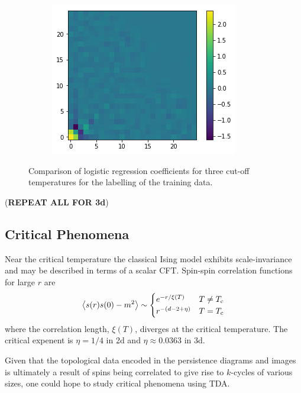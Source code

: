 \documentclass[11pt]{article}
\begin{document}
\begin{figure}[h]
	\begin{subfigure}{0.3\textwidth}
		\centering
		\includegraphics[width=\textwidth]{ising_images/logreg_2d_2519}
	\end{subfigure}
	\caption{Comparison of logistic regression coefficients for three cut-off temperatures for the labelling of the training data.}
	\label{fig:LogRegCoef2dIsing}
\end{figure}

(\textbf{REPEAT ALL FOR 3d})


\subsection{Critical Phenomena}
Near the critical temperature the classical Ising model exhibits scale-invariance and may be described in terms of a scalar CFT. Spin-spin correlation functions for large $r$ are
\begin{equation}
	\ev{s(r)s(0)-m^2} \sim \begin{cases}
		e^{-r/\xi(T)} & T\neq T_\text{c}\\
		r^{-(d-2+\eta)} & T=T_\text{c}
	\end{cases}
\end{equation}
where the correlation length, $\xi(T)$, diverges at the critical temperature. The critical expenent is $\eta=1/4$ in 2d and $\eta\approx0.0363$ in 3d.

Given that the topological data encoded in the persistence diagrams and images is ultimately a result of spins being correlated to give rise to $k$-cycles of various sizes, one could hope to study critical phenomena using TDA.
\end{document}
